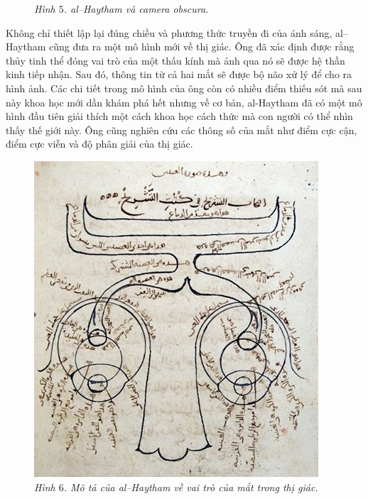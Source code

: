 \begin{multicols}{2}
\begin{figure}[H]
		\caption{\small\textit{\color{lichsutoanhoc}Hình $5$. al--Haytham và camera obscura.}}
		\vspace*{-10pt}
	\end{figure}
	Không chỉ thiết lập lại đúng chiều và phương thức truyền đi của ánh sáng, al--Haytham cũng đưa ra một mô hình mới về thị giác. Ông đã xác định được rằng thủy tinh thể đóng vai trò của một thấu kính mà ảnh qua nó sẽ được hệ thần kinh tiếp nhận. Sau đó, thông tin từ cả hai mắt sẽ được bộ não xử lý để cho ra hình ảnh. Các chi tiết trong mô hình của ông còn có nhiều điểm thiếu sót mà sau này khoa học mới dần khám phá hết nhưng về cơ bản, al-Haytham đã có một mô hình đầu tiên giải thích một cách khoa học cách thức mà con người có thể nhìn thấy thế giới này. Ông cũng nghiên cứu các thông số của mắt như điểm cực cận, điểm cực viễn và độ phân giải của thị giác.
	\begin{figure}[H]
		\vspace*{-5pt}
		\centering
		\captionsetup{labelformat= empty, justification=centering}
		\includegraphics[width= 1\linewidth]{7}
		\caption{\small\textit{\color{lichsutoanhoc}Hình $6$. Mô tả của al--Haytham về vai trò của mắt trong thị giác.}}
		\vspace*{-10pt}

\end{figure}
\end{multicols}
